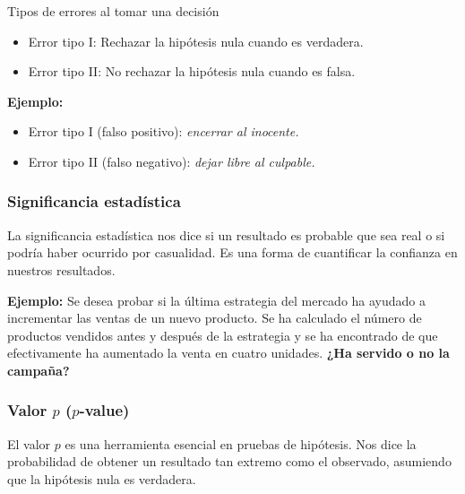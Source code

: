 \documentclass[aspectratio=169]{beamer}
\begin{document}
\begin{frame}{Tipos de errores al tomar una decisión}
    \begin{itemize}
\item Error tipo I: Rechazar la hipótesis nula cuando es verdadera.
\item Error tipo II: No rechazar la hipótesis nula cuando es falsa.
    \end{itemize}

\vfill
{\bf Ejemplo:}
    \begin{itemize}
        \item Error tipo I (falso positivo): {\em encerrar al inocente.}
        \item Error tipo II (falso negativo): {\em dejar libre al culpable.}
    \end{itemize}

    
\end{frame}






\begin{frame}
\frametitle{Significancia estadística}
La significancia estadística nos dice si un resultado es probable que sea real o si podría haber ocurrido por casualidad. Es una forma de cuantificar la confianza en nuestros resultados.

\vfill

{\bf Ejemplo:} Se desea probar si la última estrategia del mercado ha ayudado a incrementar las ventas de un nuevo producto. Se ha calculado el número de productos vendidos antes y después de la estrategia y se ha encontrado de que efectivamente ha aumentado la venta en cuatro unidades. {\bf ¿Ha servido o no la campaña?}


\end{frame}






\begin{frame}
\frametitle{Valor $p$ ($p$-value)}
El valor $p$ es una herramienta esencial en pruebas de hipótesis. Nos dice la probabilidad de obtener un resultado tan extremo como el observado, asumiendo que la hipótesis nula es verdadera.
\end{frame}
\end{document}
